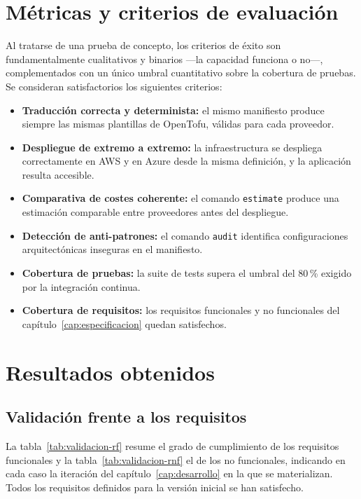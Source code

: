 \section{Métricas y criterios de evaluación}

Al tratarse de una prueba de concepto, los criterios de éxito son fundamentalmente cualitativos y
binarios —la capacidad funciona o no—, complementados con un único umbral cuantitativo sobre la
cobertura de pruebas. Se consideran satisfactorios los siguientes criterios:

\begin{itemize}
    \item \textbf{Traducción correcta y determinista:} el mismo manifiesto produce siempre las
    mismas plantillas de OpenTofu, válidas para cada proveedor.

    \item \textbf{Despliegue de extremo a extremo:} la infraestructura se despliega correctamente
    en AWS y en Azure desde la misma definición, y la aplicación resulta accesible.

    \item \textbf{Comparativa de costes coherente:} el comando \texttt{estimate} produce una
    estimación comparable entre proveedores antes del despliegue.

    \item \textbf{Detección de anti-patrones:} el comando \texttt{audit} identifica configuraciones
    arquitectónicas inseguras en el manifiesto.

    \item \textbf{Cobertura de pruebas:} la suite de tests supera el umbral del 80\,\% exigido por
    la integración continua.

    \item \textbf{Cobertura de requisitos:} los requisitos funcionales y no funcionales del
    capítulo~\ref{cap:especificacion} quedan satisfechos.
\end{itemize}

\section{Resultados obtenidos}

\subsection*{Validación frente a los requisitos}

La tabla~\ref{tab:validacion-rf} resume el grado de cumplimiento de los requisitos funcionales y la
tabla~\ref{tab:validacion-rnf} el de los no funcionales, indicando en cada caso la iteración del
capítulo~\ref{cap:desarrollo} en la que se materializan. Todos los requisitos definidos para la
versión inicial se han satisfecho.


